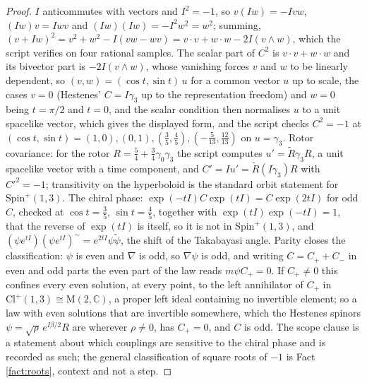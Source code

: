 \documentclass[11pt]{article}
\theoremstyle{definition}
\newcommand{\Cl}{\mathrm{Cl}}
\newcommand{\C}{\mathbb{C}}
\newcommand{\Mat}{\mathrm{M}}
\begin{document}
\begin{proof}
$I$ anticommutes with vectors and $I^{2} = -1$, so $v(Iw) = -Ivw$, $(Iw)v = Iwv$ and $(Iw)(Iw) = -I^{2}w^{2} = w^{2}$; summing, $(v + Iw)^{2} = v^{2} + w^{2} - I(vw - wv) = v \cdot v + w \cdot w - 2I(v \wedge w)$, which the script verifies on four rational samples. The scalar part of $C^{2}$ is $v \cdot v + w \cdot w$ and its bivector part is $-2I(v \wedge w)$, whose vanishing forces $v$ and $w$ to be linearly dependent, so $(v, w) = (\cos t, \sin t)\,u$ for a common vector $u$ up to scale, the cases $v = 0$ (Hestenes' $C = I\gamma_{3}$ up to the representation freedom) and $w = 0$ being $t = \pi/2$ and $t = 0$, and the scalar condition then normalises $u$ to a unit spacelike vector, which gives the displayed form, and the script checks $C^{2} = -1$ at $(\cos t, \sin t) = (1, 0), (0, 1), (\tfrac35, \tfrac45), (-\tfrac{5}{13}, \tfrac{12}{13})$ on $u = \gamma_{3}$. Rotor covariance: for the rotor $R = \tfrac54 + \tfrac34\gamma_{0}\gamma_{3}$ the script computes $u' = \tilde{R}\gamma_{3}R$, a unit spacelike vector with a time component, and $C' = Iu' = \tilde{R}(I\gamma_{3})R$ with $C'^{2} = -1$; transitivity on the hyperboloid is the standard orbit statement for $\mathrm{Spin}^{+}(1,3)$. The chiral phase: $\exp(-tI)C\exp(tI) = C\exp(2tI)$ for odd $C$, checked at $\cos t = \tfrac35$, $\sin t = \tfrac45$, together with $\exp(tI)\exp(-tI) = 1$, that the reverse of $\exp(tI)$ is itself, so it is not in $\mathrm{Spin}^{+}(1,3)$, and $(\psi e^{tI})(\psi e^{tI})^{\sim} = e^{2tI}\psi\tilde{\psi}$, the shift of the Takabayasi angle. Parity closes the classification: $\psi$ is even and $\nabla$ is odd, so $\nabla\psi$ is odd, and writing $C = C_{+} + C_{-}$ in even and odd parts the even part of the law reads $m\psi C_{+} = 0$. If $C_{+} \neq 0$ this confines every even solution, at every point, to the left annihilator of $C_{+}$ in $\Cl^{+}(1,3) \cong \Mat(2, \C)$, a proper left ideal containing no invertible element; so a law with even solutions that are invertible somewhere, which the Hestenes spinors $\psi = \sqrt{\rho}\,e^{I\beta/2}R$ are wherever $\rho \neq 0$, has $C_{+} = 0$, and $C$ is odd. The scope clause is a statement about which couplings are sensitive to the chiral phase and is recorded as such; the general classification of square roots of $-1$ is Fact \ref{fact:roots}, context and not a step.
\end{proof}
\end{document}
